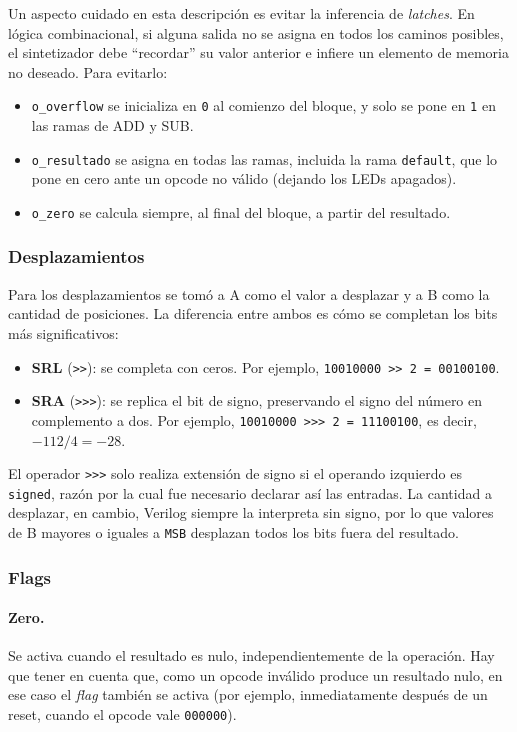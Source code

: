 Un aspecto cuidado en esta descripción es evitar la inferencia de \textit{latches}. En lógica combinacional, si alguna salida no se asigna en todos los caminos posibles, el sintetizador debe ``recordar'' su valor anterior e infiere un elemento de memoria no deseado. Para evitarlo:
\begin{itemize}
	\item \texttt{o\_overflow} se inicializa en \texttt{0} al comienzo del bloque, y solo se pone en \texttt{1} en las ramas de ADD y SUB.
	\item \texttt{o\_resultado} se asigna en todas las ramas, incluida la rama \texttt{default}, que lo pone en cero ante un opcode no válido (dejando los LEDs apagados).
	\item \texttt{o\_zero} se calcula siempre, al final del bloque, a partir del resultado.
\end{itemize}

\subsubsection{Desplazamientos}
Para los desplazamientos se tomó a A como el valor a desplazar y a B como la cantidad de posiciones. La diferencia entre ambos es cómo se completan los bits más significativos:
\begin{itemize}
	\item \textbf{SRL} (\texttt{>>}): se completa con ceros. Por ejemplo, \texttt{10010000 >> 2 = 00100100}.
	\item \textbf{SRA} (\texttt{>>>}): se replica el bit de signo, preservando el signo del número en complemento a dos. Por ejemplo, \texttt{10010000 >>> 2 = 11100100}, es decir, $-112 / 4 = -28$.
\end{itemize}
El operador \texttt{>>>} solo realiza extensión de signo si el operando izquierdo es \texttt{signed}, razón por la cual fue necesario declarar así las entradas. La cantidad a desplazar, en cambio, Verilog siempre la interpreta sin signo, por lo que valores de B mayores o iguales a \texttt{MSB} desplazan todos los bits fuera del resultado.

\subsubsection{Flags}
\paragraph{Zero.} Se activa cuando el resultado es nulo, independientemente de la operación. Hay que tener en cuenta que, como un opcode inválido produce un resultado nulo, en ese caso el \textit{flag} también se activa (por ejemplo, inmediatamente después de un reset, cuando el opcode vale \texttt{000000}).

